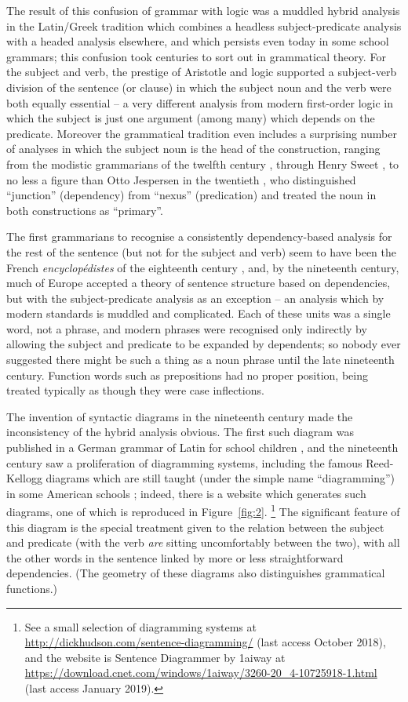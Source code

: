 \documentclass[output=paper
	        ,collection
	        ,collectionchapter
 	        ,biblatex
                ,babelshorthands
                ,newtxmath
                ,draftmode
                ,colorlinks, citecolor=brown
]{./langsci/langscibook}
\begin{document}
The result of this confusion of grammar with logic was a muddled hybrid analysis in the Latin/Greek tradition which combines a headless subject-predicate analysis with a headed analysis elsewhere, and which persists even today in some school grammars; this confusion took centuries to sort out in grammatical theory. For the subject and verb, the prestige of Aristotle and logic supported a subject-verb division of the sentence (or clause) in which the subject noun and the verb were both equally essential – a very different analysis from modern first-order logic in which the subject is just one argument (among many) which depends on the predicate. Moreover the grammatical tradition even includes a surprising number of analyses in which the subject noun is the head of the construction, ranging from the modistic grammarians of the twelfth century \citep[83]{Robins1967}, through Henry Sweet \citep[17]{Sweet1891}, to no less a figure than Otto Jespersen in the twentieth \citep{Jespersen37a-u}, who distinguished ``junction'' (dependency) from ``nexus'' (predication) and treated the noun in both constructions as ``primary''.

The first grammarians to recognise a consistently dependency-based analysis for the rest of the sentence (but not for the subject and verb) seem to have been the French \emph{encyclopédistes} of the eighteenth century \citep{KahaneTBA}, and, by the nineteenth century, much of Europe accepted a theory of sentence structure based on dependencies, but with the subject-predicate analysis as an exception – an analysis which by modern standards is muddled and complicated. Each of these units was a single word, not a phrase, and modern phrases were recognised only indirectly by allowing the subject and predicate to be expanded by dependents; so nobody ever suggested there might be such a thing as a noun phrase until the late nineteenth century. Function words such as prepositions had no proper position, being treated typically as though they were case inflections.

The invention of syntactic diagrams in the nineteenth century made the inconsistency of the hybrid analysis obvious. The first such diagram was published in a German grammar of Latin for school children \citep{Billroth1832}, and the nineteenth century saw a proliferation of diagramming systems, including the famous Reed-Kellogg diagrams which are still taught (under the simple name ``diagramming'') in some American schools \citep{ReedKellog1890}; indeed, there is a website which generates such diagrams, one of which is reproduced in Figure~\ref{fig:2}.%
%
\footnote{See a small selection of diagramming systems at \url{http://dickhudson.com/sentence-diagramming/} (last access October 2018), and the website is Sentence Diagrammer by 1aiway at \url{https://download.cnet.com/windows/1aiway/3260-20_4-10725918-1.html} (last access January 2019).}
%
The significant feature of this diagram is the special treatment given to the relation between the subject and predicate (with the verb \emph{are} sitting uncomfortably between the two), with all the other words in the sentence linked by more or less straightforward dependencies. (The geometry of these diagrams also distinguishes grammatical functions.)
 
\end{document}
